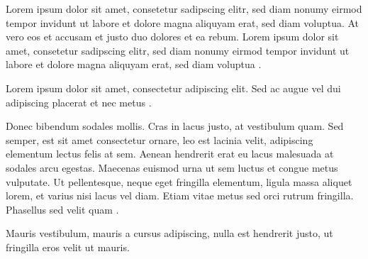 Lorem ipsum dolor sit amet, consetetur sadipscing elitr, sed diam nonumy eirmod tempor invidunt ut labore et dolore magna aliquyam erat, sed diam voluptua. At vero eos et accusam et justo duo dolores et ea rebum. Lorem ipsum dolor sit amet, consetetur sadipscing elitr, sed diam nonumy eirmod tempor invidunt ut labore et dolore magna aliquyam erat, sed diam voluptua \cite{Wegener2000629}.


Lorem ipsum dolor sit amet, consectetur adipiscing elit. Sed ac augue vel dui adipiscing placerat et nec metus \cite{Wolchik2000843}. 

Donec bibendum sodales mollis. Cras in lacus  justo, at vestibulum quam. Sed semper, est sit amet consectetur ornare, leo est lacinia velit, adipiscing elementum lectus felis at sem. Aenean hendrerit erat eu lacus malesuada at sodales arcu egestas. Maecenas euismod urna ut sem luctus et congue metus vulputate. Ut pellentesque, neque eget fringilla elementum, ligula massa aliquet lorem, et varius nisi lacus vel diam. Etiam vitae metus sed orci rutrum fringilla. Phasellus sed velit quam \cite{Zuckerman199486}. 

Mauris vestibulum, mauris a cursus adipiscing, nulla est hendrerit justo, ut fringilla eros velit ut mauris.
